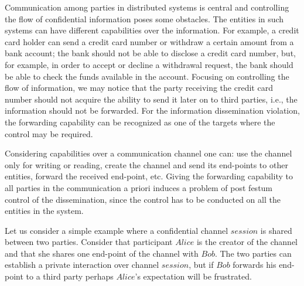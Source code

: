 Communication among parties in distributed systems is central and controlling the flow of confidential information poses some obstacles. 
The entities in such systems can have different capabilities over the information. 
For example, a credit card holder can send a credit card number or withdraw a certain amount from a bank account; the bank should not be able to disclose a credit card number, but, for example, in order to accept or decline a withdrawal request, the bank should be able to check the funds available in the account.
Focusing on controlling the flow of information, we may notice that the party receiving the credit card number should not acquire the ability to send it later on to third parties, i.e., the information should not be forwarded. 
For the information dissemination violation, the forwarding capability can be recognized as one of the targets where the control may be required.


Considering capabilities over a communication channel one can: use the channel only for writing or reading, create the channel and send its end-points to other entities, forward  the received end-point, etc. 
Giving the forwarding capability to all parties in the communication a priori induces a problem of post festum control of the dissemination, since the control has to be conducted on all the entities in the system.


Let us consider a simple example where a confidential channel $\mathit{session}$ is shared between two parties. %
Consider that participant $\mathit{Alice}$ is the creator of the channel and that she shares one end-point of the channel with $\mathit{Bob}$. 
The two parties can establish a private interaction over channel $\mathit{session}$, but if $\mathit{Bob}$ forwards his end-point to a third party perhaps $\mathit{Alice}$'s expectation will be frustrated.

